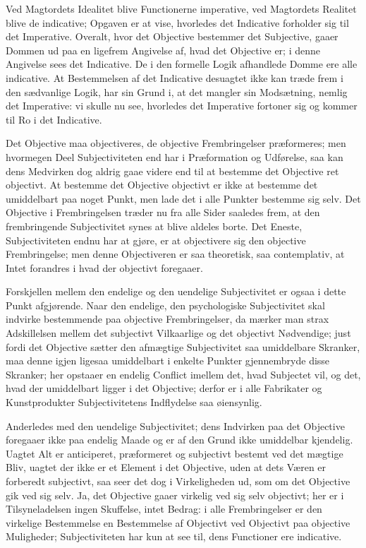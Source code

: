 \documentclass[12pt]{book}
\newcommand{\opage}[1]{\marginnote{\footnotesize\textit{[#1]}}}
\begin{document}
Ved Magtordets Idealitet blive Functionerne imperative,
ved Magtordets Realitet blive de indicative; Opgaven er at
vise, hvorledes det Indicative forholder sig til det Imperative.
Overalt, hvor det Objective bestemmer det Subjective, gaaer
Dommen ud paa en ligefrem Angivelse af, hvad det Objective
er; i denne Angivelse sees det Indicative. De i den
formelle Logik afhandlede Domme ere alle indicative. At Bestemmelsen
af det Indicative desuagtet ikke kan træde frem i
den sædvanlige Logik, har sin Grund i, at det mangler sin
Modsætning, nemlig det Imperative: vi skulle nu see, hvorledes
det Imperative fortoner sig og kommer til Ro i det Indicative.

Det Objective maa objectiveres, de objective Frembringelser
præformeres; men hvormegen Deel Subjectiviteten end
har i Præformation og Udførelse, saa kan dens Medvirken
dog aldrig gaae videre end til at bestemme det Objective ret
objectivt. At bestemme det Objective objectivt er ikke at
be\opage{159}stemme det umiddelbart paa noget Punkt, men lade det i alle
Punkter bestemme sig selv. Det Objective i Frembringelsen
træder nu fra alle Sider saaledes frem, at den frembringende
Subjectivitet synes at blive aldeles borte. Det Eneste, Subjectiviteten
endnu har at gjøre, er at objectivere sig den objective
Frembringelse; men denne Objectiveren er saa theoretisk,
saa contemplativ, at Intet forandres i hvad der objectivt
foregaaer.

Forskjellen mellem den endelige og den uendelige Subjectivitet
er ogsaa i dette Punkt afgjørende. Naar den endelige,
den psychologiske Subjectivitet skal indvirke bestemmende
paa objective Frembringelser, da mærker man strax Adskillelsen
mellem det subjectivt Vilkaarlige og det objectivt Nødvendige;
just fordi det Objective sætter den afmægtige Subjectivitet saa
umiddelbare Skranker, maa denne igjen ligesaa umiddelbart i
enkelte Punkter gjennembryde disse Skranker; her opstaaer en
endelig Conflict imellem det, hvad Subjectet vil, og det, hvad
der umiddelbart ligger i det Objective; derfor er i alle Fabrikater
og Kunstprodukter Subjectivitetens Indflydelse saa
øiensynlig.

Anderledes med den uendelige Subjectivitet; dens Indvirken
paa det Objective foregaaer ikke paa endelig Maade og
er af den Grund ikke umiddelbar kjendelig. Uagtet Alt er
anticiperet, præformeret og subjectivt bestemt ved det mægtige
Bliv, uagtet der ikke er et Element i det Objective, uden at
dets Væren er forberedt subjectivt, saa seer det dog i Virkeligheden
ud, som om det Objective gik ved sig selv. Ja, det
Objective gaaer virkelig ved sig selv objectivt; her er i Tilsyneladelsen
ingen Skuffelse, intet Bedrag: i alle Frembringelser
er den virkelige Bestemmelse en Bestemmelse af Objectivt
ved Objectivt paa objective Muligheder; Subjectiviteten
har kun at see til, dens Functioner ere indicative.
\end{document}
